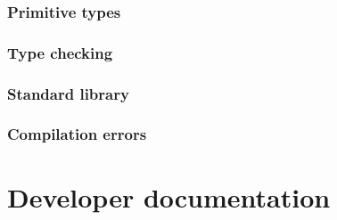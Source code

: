 \documentclass[12pt]{article}
\begin{document}
\subsubsection{Primitive types}
\subsubsection{Type checking}
\subsubsection{Standard library}
\subsubsection{Compilation errors}

\section{Developer documentation}
\end{document}
